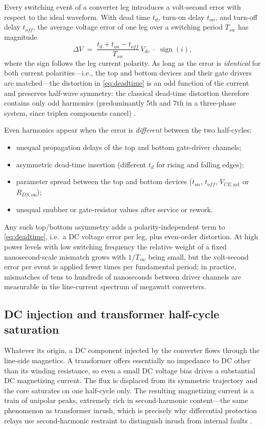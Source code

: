 \documentclass[11pt,a4paper]{article}
\begin{document}
Every switching event of a converter leg introduces a volt-second error with
respect to the ideal waveform. With dead time $t_d$, turn-on delay
$t_{on}$, and turn-off delay $t_{off}$, the average voltage error of one leg
over a switching period $T_{sw}$ has magnitude
%
\begin{equation}
\Delta V \;=\; \frac{t_d + t_{on} - t_{off}}{T_{sw}}\, V_{dc}
\;\cdot\; \operatorname{sign}(i),
\label{eq:deadtime}
\end{equation}
%
where the sign follows the leg current polarity. As long as the error is
\emph{identical} for both current polarities---i.e., the top and bottom devices
and their gate drivers are matched---the distortion in \eqref{eq:deadtime} is an
odd function of the current and preserves half-wave symmetry: the classical
dead-time distortion therefore contains only odd harmonics (predominantly 5th
and 7th in a three-phase system, since triplen components cancel)
\cite{jeong,choi}.

Even harmonics appear when the error is \emph{different} between the two
half-cycles:
%
\begin{itemize}
\item unequal propagation delays of the top and bottom gate-driver channels;
\item asymmetric dead-time insertion (different $t_d$ for rising and falling
edges);
\item parameter spread between the top and bottom devices ($t_{on}$,
$t_{off}$, $V_{CE,\mathrm{sat}}$ or $R_{DS,\mathrm{on}}$);
\item unequal snubber or gate-resistor values after service or rework.
\end{itemize}
%
Any such top/bottom asymmetry adds a polarity-independent term to
\eqref{eq:deadtime}, i.e.\ a DC voltage error per leg, plus even-order
distortion. At high power levels with low switching frequency the relative
weight of a fixed nanosecond-scale mismatch grows with $1/T_{sw}$ being small,
but the volt-second error per event is applied fewer times per fundamental
period; in practice, mismatches of tens to hundreds of nanoseconds between
driver channels are measurable in the line-current spectrum of megawatt
converters.

\subsection{DC injection and transformer half-cycle saturation}

Whatever its origin, a DC component injected by the converter flows through the
line-side magnetics. A transformer offers essentially no impedance to DC other
than its winding resistance, so even a small DC voltage bias drives a
substantial DC magnetizing current. The flux is displaced from its symmetric
trajectory and the core saturates on one half-cycle only. The resulting
magnetizing current is a train of unipolar peaks, extremely rich in
second-harmonic content---the same phenomenon as transformer inrush, which is
precisely why differential protection relays use second-harmonic restraint to
distinguish inrush from internal faults \cite{guzman}.
\end{document}

